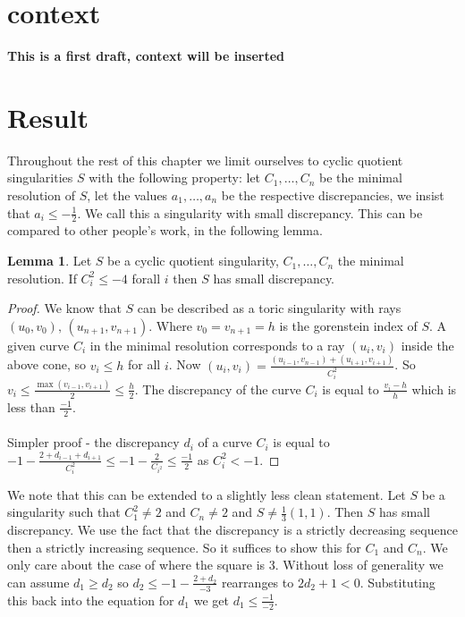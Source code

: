 \documentclass[11pt]{report}
\theoremstyle{definition}
\theoremstyle{definition}
\theoremstyle{definition}
\theoremstyle{definition}
\theoremstyle{definition}
\newtheorem{lem}[thm]{Lemma}
\theoremstyle{definition}
\theoremstyle{definition}
\theoremstyle{definition}
\begin{document}
 

\section{context}
\textbf{This is a first draft, context will be inserted}

\section{Result}

Throughout the rest of this chapter we limit ourselves to cyclic quotient singularities $S$ with the following property: let $C_1, \dots ,C_n$ be the minimal resolution of $S$, let the values $a_1, \dots ,a_n$ be the respective discrepancies, we insist that $a_i \leq -\frac{1}{2}$. We call this a singularity with small discrepancy. This can be compared to other people's work, in the following lemma.
\begin{lem}
Let $S$ be a cyclic quotient singularity, $C_1, \dots ,C_n$ the minimal resolution. If $C_i^2 \leq -4$ forall $i$ then $S$ has small discrepancy.
\end{lem}
\begin{proof}
We know that $S$ can be described as a toric singularity with rays $(u_0, v_0), \, (u_{n+1},v_{n+1})$. Where $v_0 = v_{n+1} = h$ is the gorenstein index of $S$. A given curve  $C_i$ in the minimal resolution corresponds to a ray $(u_i,v_i)$ inside the above cone, so $v_i \leq h$ for all $i$. Now $(u_i, v_i) = \frac{(u_{i-1}, v_{n-1}) + (u_{i+1}, v_{i+1})}{C_i^2}$. So $v_i \leq \frac{\max(v_{i-1}, v_{i+1})}{2} \leq \frac{h}{2}$. The discrepancy of the curve $C_i$ is equal to $\frac{v_i-h}{h}$ which is less than $\frac{-1}{2}$.
\\
\\
Simpler proof - the discrepancy $d_i$ of a curve $C_i$ is equal to $-1 - \frac{2 + d_{i-1} + d_{i+1}}{C_i^2} \leq -1 - \frac{2}{C_{i^2}} \leq \frac{-1}{2}$ as $C_i^2 < -1$.
\end{proof}
We note that this can be extended to a slightly less clean statement. Let $S$ be a singularity such that $C_1^2 \neq 2$ and $C_n \neq 2$ and $S \neq \frac{1}{3}(1,1)$. Then $S$ has small discrepancy. We use the fact that the discrepancy is a strictly decreasing sequence then a strictly increasing sequence. So it suffices to show this for $C_1$ and $C_n$. We only care about the case of where the square is $3$. Without loss of generality we can assume $d_1 \geq d_2$ so $ d_2 \leq -1 - \frac{2 + d_2}{-3}$ rearranges to $2d_2 + 1 < 0$. Substituting this back into the equation for $d_1$ we get $d_1 \leq  \frac{-1}{-2}$.
\end{document}

